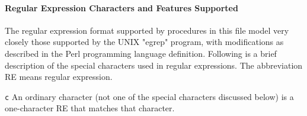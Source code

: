 





\paragraph{Regular Expression Characters and Features Supported}
The regular expression format supported by procedures in this file model
very closely those supported by the UNIX
"egrep" program, with modifications as
described in the Perl programming language definition. Following is a
brief description of the special characters used in regular
expressions. The abbreviation RE means regular expression.

\texttt{c} An ordinary character (not one of the special characters
discussed below) is a one-character RE that matches that character.

